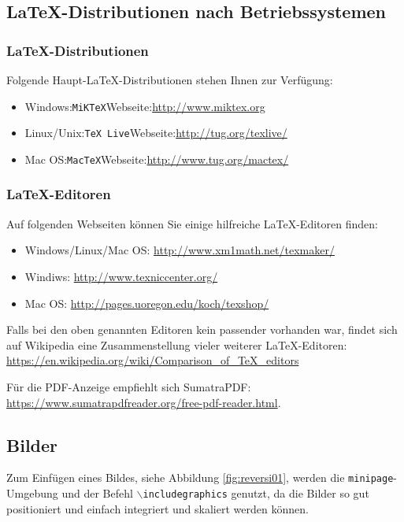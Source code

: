 \documentclass[12pt,a4paper,bibliography=totoc,listof=totoc]{scrartcl}
\begin{document}
\subsection{\LaTeX-Distributionen nach Betriebssystemen}

\subsubsection{\LaTeX-Distributionen}
Folgende Haupt-\LaTeX-Distributionen stehen Ihnen zur Verfügung:
\begin{itemize}
  \item Windows:\quad \texttt{MiKTeX}\quad Webseite:\quad\url{http://www.miktex.org}
  \item Linux/Unix:\quad \texttt{TeX Live}\quad Webseite:\quad\url{http://tug.org/texlive/}
  \item Mac OS:\quad \texttt{MacTeX}\quad Webseite:\quad\url{http://www.tug.org/mactex/}
\end{itemize}

\subsubsection{\LaTeX-Editoren}
Auf folgenden Webseiten können Sie einige hilfreiche \LaTeX-Editoren finden:
\begin{itemize}
  \item Windows/Linux/Mac OS: \url{http://www.xm1math.net/texmaker/}
  \item Windiws: \url{http://www.texniccenter.org/}
  \item Mac OS: \url{http://pages.uoregon.edu/koch/texshop/}
\end{itemize}

Falls bei den oben genannten Editoren kein passender vorhanden war, findet sich auf Wikipedia eine Zusammenstellung vieler weiterer \LaTeX-Editoren:\\
\url{https://en.wikipedia.org/wiki/Comparison_of_TeX_editors}

Für die PDF-Anzeige empfiehlt sich SumatraPDF: \\ 
\url{https://www.sumatrapdfreader.org/free-pdf-reader.html}.


\subsection{Bilder}
Zum Einfügen eines Bildes, siehe Abbildung \ref{fig:reversi01}, werden die \texttt{minipage}-Umgebung und der Befehl \texttt{$\backslash$includegraphics} genutzt, da die Bilder so gut positioniert und einfach integriert und skaliert werden können.
\end{document}

